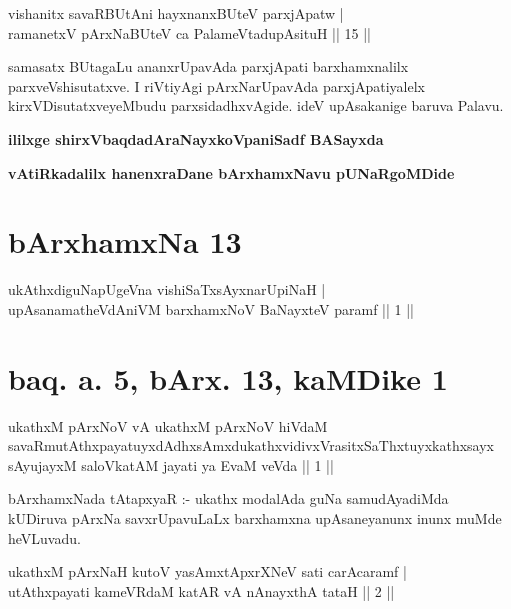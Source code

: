 
\begin{shl}
vishanitx savaRBUtAni hayxnanxBUteV parxjApatw  | \\
ramanetxV pArxNaBUteV ca PalameVtadupAsituH \hfill ||  15 || 
\end{shl}

\begin{artha}
samasatx BUtagaLu ananxrUpavAda parxjApati barxhamxnalilx parxveVshisutatxve. I riVtiyAgi pArxNarUpavAda parxjApatiyalelx kirxVDisutatxveyeMbudu parxsidadhxvAgide. ideV upAsakanige baruva Palavu.
\end{artha}

\begin{center}
{\bf ililxge shirxVbaqdadAraNayxkoVpaniSadf BASayxda}
\smallskip

{\bf vAtiRkadalilx hanenxraDane bArxhamxNavu pUNaRgoMDide}
\end{center}

\section*{bArxhamxNa 13}

\begin{shl}
ukAthxdiguNapUgeVna vishiSaTxsAyxnarUpiNaH  | \\
upAsanamatheVdAniVM barxhamxNoV BaNayxteV paramf \hfill ||  1 || 
\end{shl}

\section*{baq. a. 5, bArx. 13, kaMDike 1}

\begin{shl}
ukathxM pArxNoV vA ukathxM pArxNoV hiVdaM savaRmutAthxpayatuyxdAdhxsAmxdukathxvidivxVrasitxSaThxtuyxkathxsayx sAyujayxM saloVkatAM jayati ya EvaM veVda || 1 ||
\end{shl}

\begin{artha}
bArxhamxNada tAtapxyaR :- ukathx modalAda guNa samudAyadiMda kUDiruva pArxNa savxrUpavuLaLx barxhamxna upAsaneyanunx inunx muMde heVLuvadu.
\end{artha}


\begin{shl}
\footnotemark[1]{}ukathxM pArxNaH kutoV yasAmxtApxrXNeV sati carAcaramf | \\
\footnotemark[2]{}utAthxpayati kameVRdaM katAR vA nAnayxthA tataH \hfill ||  2 || 
\end{shl}

